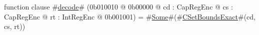 function clause #\hyperref[zdecode]{decode}# (0b010010 @ 0b00000 @ cd : CapRegEnc @ cs : CapRegEnc @ rt : IntRegEnc @ 0b001001) = #\hyperref[zSome]{Some}#(#\hyperref[zCSetBoundsExact]{CSetBoundsExact}#(cd, cs, rt))
